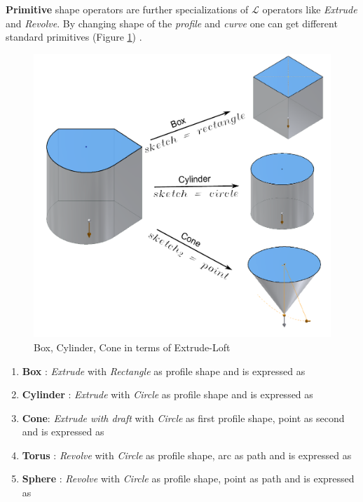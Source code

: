 
{\bf Primitive} shape operators are further specializations of {\bf $\mathcal{L}$} operators like {\em Extrude} and {\em Revolve}. By changing shape of the {\em profile} and {\em curve} one can get different standard primitives  (Figure \ref{figure_ExtrudeBoxCylCone}) .

\begin{figure}[htbp]
	\includegraphics[scale=0.35]{../Common/images//ExtrudeBoxCylCone.pdf} 
\caption{Box, Cylinder, Cone in terms of Extrude-Loft}
\label{figure_ExtrudeBoxCylCone}
\end{figure}

\begin{enumerate}
\item {\bf Box} : {\em Extrude} with {\em Rectangle} as profile shape and is expressed as 	
\item {\bf Cylinder} : {\em Extrude} with {\em Circle} as profile shape and is expressed as 
\item {\bf Cone}: {\em Extrude with draft} with {\em Circle} as first profile shape, point as second and is expressed as 
\item {\bf Torus} : {\em Revolve} with {\em Circle} as profile shape, arc as path and is expressed as 	
\item {\bf Sphere} : {\em Revolve} with {\em Circle} as profile shape, point as path and is expressed as 	
\end{enumerate}

